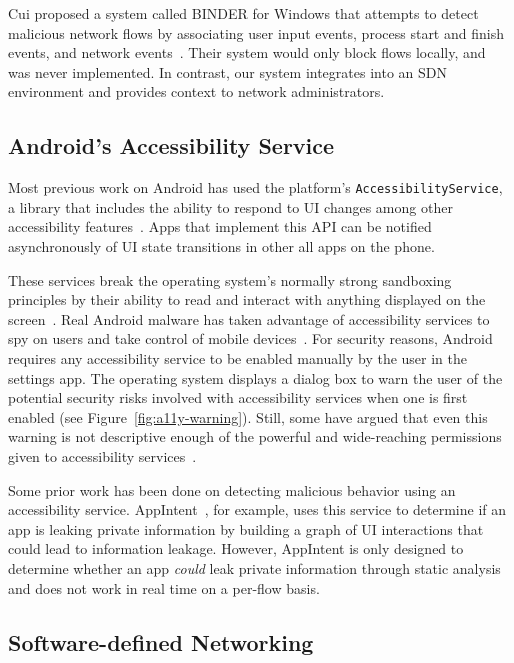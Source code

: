 Cui \etal proposed a system called BINDER for Windows that attempts to detect
malicious network flows by associating user input events, process start and
finish events, and network events~\cite{cui2005}. Their system would only block
flows locally, and was never implemented. In contrast, our system integrates
into an SDN environment and provides context to network administrators.


\subsection{Android's Accessibility Service}
\label{sec:androids-accessibility-service}

Most previous work on Android has used the platform's
\texttt{AccessibilityService}, a library that includes the ability to respond to
UI changes among other accessibility features~\cite{googledevelopers2020}. Apps
that implement this API can be notified asynchronously of UI state transitions
in other all apps on the phone.

These services break the operating system's normally strong sandboxing
principles by their ability to read and interact with anything displayed on the
screen~\cite{kalysch2018, diao2019}. Real Android malware has taken advantage of
accessibility services to spy on users and take control of mobile
devices~\cite{kraunelis2013}. For security reasons, Android requires any
accessibility service to be enabled manually by the user in the settings app.
The operating system displays a dialog box to warn the user of the potential
security risks involved with accessibility services when one is first enabled
(see Figure~\ref{fig:a11y-warning}). Still, some have argued that even this
warning is not descriptive enough of the powerful and wide-reaching permissions
given to accessibility services~\cite{kalysch2018}.

Some prior work has been done on detecting malicious behavior using an
accessibility service. AppIntent~\cite{yang2013}, for example, uses this service
to determine if an app is leaking private information by building a graph of UI
interactions that could lead to information leakage. However, AppIntent is only
designed to determine whether an app \textit{could} leak private information
through static analysis and does not work in real time on a per-flow basis.

\subsection{Software-defined Networking}
\label{sec:software-defined-networking}

